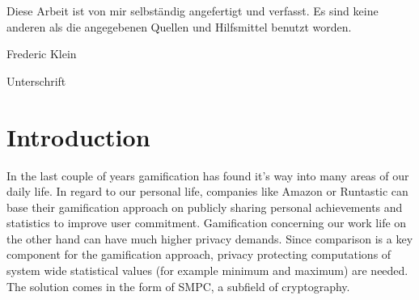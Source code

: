 
%



	
\restoregeometry


\clearpage
\vspace*{\fill}
\begin{center}
	\begin{minipage}{.8\textwidth}
		\thispagestyle{empty} %
		Diese Arbeit ist von mir selbst\"andig angefertigt und verfasst. Es sind keine anderen als die angegebenen Quellen und Hilfsmittel benutzt worden.\par
		\vspace{1cm}
		Frederic Klein \dotfill \par
		Unterschrift
	\end{minipage}
\end{center}
\vfill %
\clearpage


\begin{abstract}
	\thispagestyle{plain}
	\setcounter{page}{1}
\end{abstract}

\tableofcontents
\setcounter{page}{2}
\listoffigures
{\let\clearpage\relax \listoftables}

\printnoidxglossary[type=\acronymtype,title={List of Acronyms}]

{\let\clearpage\relax \printnoidxglossary[type=symbols,sort=letter]}

\chapter{Introduction}
In the last couple of years gamification has found it's way into many areas of our daily life. In regard to our personal life, companies like Amazon or Runtastic can base their gamification approach on publicly sharing personal achievements and statistics to improve user commitment. Gamification concerning our work life on the other hand can have much higher privacy demands. Since comparison is a key component for the gamification approach, privacy protecting computations of system wide statistical values (for example minimum and maximum) are needed. The solution comes in the form of \gls{SMPC}, a subfield of cryptography.


